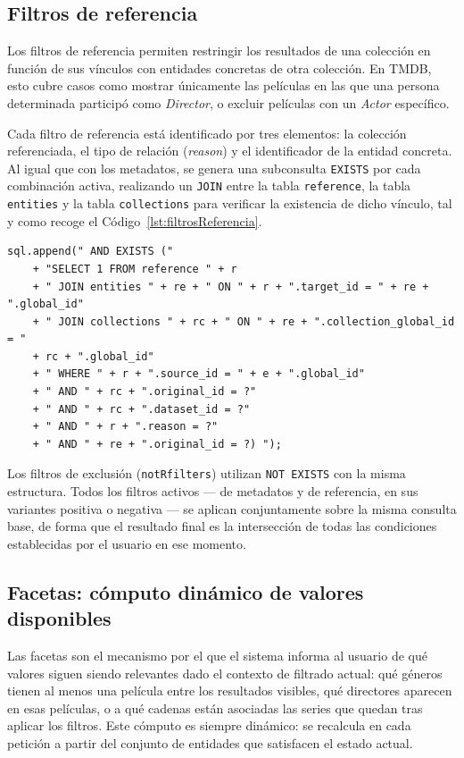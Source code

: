    \subsection{Filtros de referencia}

Los filtros de referencia permiten restringir los resultados de una colección en función
de sus vínculos con entidades concretas de otra colección. En TMDB, esto cubre casos como
mostrar únicamente las películas en las que una persona determinada participó como
\textit{Director}, o excluir películas con un \textit{Actor} específico.

Cada filtro de referencia está identificado por tres elementos: la colección referenciada,
el tipo de relación (\textit{reason}) y el identificador de la entidad concreta. Al igual
que con los metadatos, se genera una subconsulta \texttt{EXISTS} por cada combinación
activa, realizando un \texttt{JOIN} entre la tabla \texttt{reference}, la tabla
\texttt{entities} y la tabla \texttt{collections} para verificar la existencia de dicho
vínculo, tal y como recoge el Código~\ref{lst:filtrosReferencia}.

\begin{lstlisting}[style=javaStyle, caption=Filtros de referencia, label=lst:filtrosReferencia]
sql.append(" AND EXISTS ("
    + "SELECT 1 FROM reference " + r
    + " JOIN entities " + re + " ON " + r + ".target_id = " + re + ".global_id"
    + " JOIN collections " + rc + " ON " + re + ".collection_global_id = "
    + rc + ".global_id"
    + " WHERE " + r + ".source_id = " + e + ".global_id"
    + " AND " + rc + ".original_id = ?"
    + " AND " + rc + ".dataset_id = ?"
    + " AND " + r + ".reason = ?"
    + " AND " + re + ".original_id = ?) ");
\end{lstlisting}

Los filtros de exclusión (\texttt{notRfilters}) utilizan \texttt{NOT EXISTS} con la misma
estructura. Todos los filtros activos --- de metadatos y de referencia, en sus variantes
positiva o negativa --- se aplican conjuntamente sobre la misma consulta base, de forma
que el resultado final es la intersección de todas las condiciones establecidas por el
usuario en ese momento.

    \subsection{Facetas: cómputo dinámico de valores disponibles}

Las facetas son el mecanismo por el que el sistema informa al usuario de qué valores
siguen siendo relevantes dado el contexto de filtrado actual: qué géneros tienen al
menos una película entre los resultados visibles, qué directores aparecen en esas
películas, o a qué cadenas están asociadas las series que quedan tras aplicar los filtros.
Este cómputo es siempre dinámico: se recalcula en cada petición a partir del conjunto
de entidades que satisfacen el estado actual.

